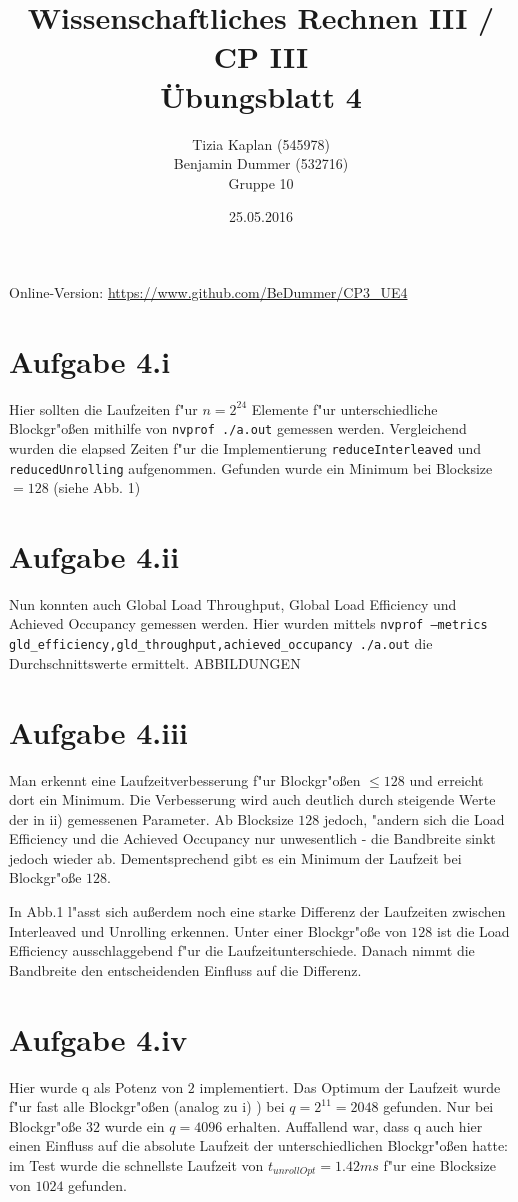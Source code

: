 \documentclass[%
	paper=A4,	%
	pagesize,	%
	DIV=calc,	%
	smallheadings,	%
	ngerman		%
]{scrartcl}
\title{{\bf Wissenschaftliches Rechnen III / CP III}\\Übungsblatt 4}
\author{Tizia Kaplan (545978)\\Benjamin Dummer (532716)\\ Gruppe 10}
\date{25.05.2016}
\begin{document}
\maketitle
Online-Version: \href{https://www.github.com/BeDummer/CP3_UE4}{\url{https://www.github.com/BeDummer/CP3_UE4}}

\section*{Aufgabe 4.i}
Hier sollten die Laufzeiten f"ur $n=2^24$ Elemente f"ur unterschiedliche Blockgr"o\ss en mithilfe von \texttt{nvprof ./a.out} gemessen werden. Vergleichend wurden die elapsed Zeiten f"ur die Implementierung \texttt{reduceInterleaved} und \texttt{reducedUnrolling} aufgenommen. Gefunden wurde ein Minimum bei Blocksize $=128$ (siehe Abb. 1) 

\section*{Aufgabe 4.ii}
Nun konnten auch Global Load Throughput, Global Load Efficiency und Achieved Occupancy gemessen werden. Hier wurden mittels \texttt{nvprof --metrics gld_efficiency,gld_throughput,achieved_occupancy ./a.out} die Durchschnittswerte ermittelt.
ABBILDUNGEN

\section*{Aufgabe 4.iii}
Man erkennt eine Laufzeitverbesserung f"ur Blockgr"o\ss en $\leq 128$ und erreicht dort ein Minimum. Die Verbesserung wird auch deutlich durch steigende Werte der in ii) gemessenen Parameter. Ab Blocksize $128$ jedoch, "andern sich die Load Efficiency und die Achieved Occupancy nur unwesentlich - die Bandbreite sinkt jedoch wieder ab. Dementsprechend gibt es ein Minimum der Laufzeit bei Blockgr"o\ss e $128$.

In Abb.1 l"asst sich au\ss erdem noch eine starke Differenz der Laufzeiten zwischen Interleaved und Unrolling erkennen. Unter einer Blockgr"o\ss e von $128$ ist die Load Efficiency ausschlaggebend f"ur die Laufzeitunterschiede. Danach nimmt die Bandbreite den entscheidenden Einfluss auf die Differenz.

\section*{Aufgabe 4.iv}
Hier wurde q als Potenz von $2$ implementiert. Das Optimum der Laufzeit wurde f"ur fast alle Blockgr"o\ss en (analog zu i) ) bei $q=2^11=2048$ gefunden. Nur bei Blockgr"o\ss e $32$ wurde ein $q=4096$ erhalten. Auffallend war, dass q auch hier einen Einfluss auf die absolute Laufzeit der unterschiedlichen Blockgr"o\ss en hatte: im Test wurde die schnellste Laufzeit von $t_{unrollOpt}=1.42 ms$ f"ur eine Blocksize von $1024$ gefunden.
\end{document}
